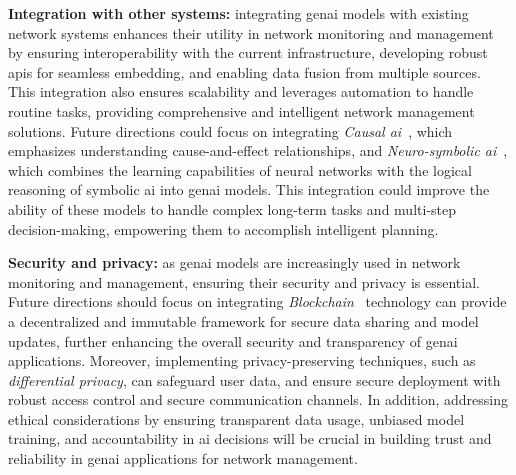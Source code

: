 %

\vspace{5pt}
\noindent
\textbf{Integration with other systems:}
integrating \gls{genai} models with existing network systems enhances their utility in network monitoring and management by ensuring interoperability with the current infrastructure, developing robust \glspl{api} for seamless embedding, and enabling data fusion from multiple sources. This integration also ensures scalability and leverages automation to handle routine tasks, providing comprehensive and intelligent network management solutions.
Future directions could focus on integrating \emph{Causal \gls{ai}}~\cite{kaddour2022causal}, which emphasizes understanding cause-and-effect relationships, and \emph{Neuro-symbolic \gls{ai}}~\cite{sarker2021neuro, hitzler2022neuro}, 
which combines the learning capabilities of neural networks with the logical reasoning of symbolic \gls{ai} into \gls{genai} models. 
%
This integration could improve the ability of these models to handle complex long-term tasks and multi-step decision-making, empowering them to accomplish intelligent planning.
%

\vspace{5pt}
\noindent
\textbf{Security and privacy:}
as \gls{genai} models are increasingly used in network monitoring and management, ensuring their security and privacy is essential. 
Future directions should focus on
integrating \emph{Blockchain}~\cite{zheng2018blockchain, pilkington2016blockchain} technology can provide a decentralized and immutable framework for secure data sharing and model updates, further enhancing the overall security and transparency of \gls{genai} applications.
Moreover, implementing privacy-preserving techniques, such as \emph{differential
privacy}, can safeguard user data, and ensure secure deployment with robust access control and secure communication channels.
%
In addition, addressing ethical considerations by ensuring transparent data usage, unbiased model training, and accountability in \gls{ai} decisions will be crucial in building trust and reliability in \gls{genai} applications for network management.
%

